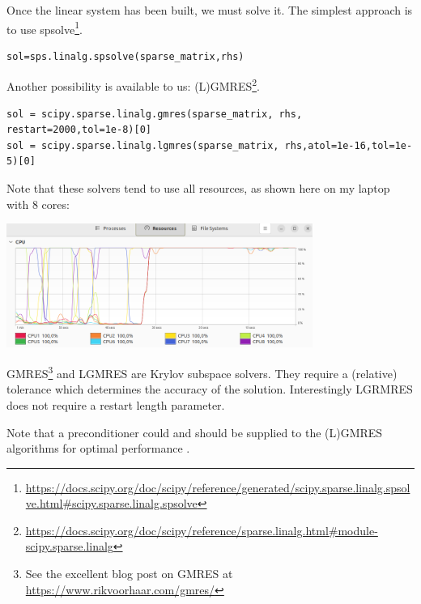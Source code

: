 
Once the linear system has been built, we must solve it. 
The simplest approach is to use 
spsolve\footnote{\url{https://docs.scipy.org/doc/scipy/reference/generated/scipy.sparse.linalg.spsolve.html#scipy.sparse.linalg.spsolve}}.

\begin{lstlisting}       
sol=sps.linalg.spsolve(sparse_matrix,rhs)
\end{lstlisting}       

Another possibility is available to us: (L)GMRES\footnote{\url{https://docs.scipy.org/doc/scipy/reference/sparse.linalg.html#module-scipy.sparse.linalg}}.

\begin{lstlisting}       
sol = scipy.sparse.linalg.gmres(sparse_matrix, rhs, restart=2000,tol=1e-8)[0]
sol = scipy.sparse.linalg.lgmres(sparse_matrix, rhs,atol=1e-16,tol=1e-5)[0]
\end{lstlisting}       

Note that these solvers tend to use all resources, as shown here on my laptop with 8 cores:
\begin{center}
\includegraphics[width=10cm]{RESULTS/timings/resources}
\end{center}

GMRES\footnote{See the excellent blog post on GMRES at \url{https://www.rikvoorhaar.com/gmres/}} 
and LGMRES are Krylov subspace solvers. They require a (relative) tolerance
which determines the accuracy of the solution. 
Interestingly LGRMRES does not require a restart length parameter.

Note that a preconditioner could and should be supplied to the (L)GMRES 
algorithms for optimal performance \cite{krhb12}.
